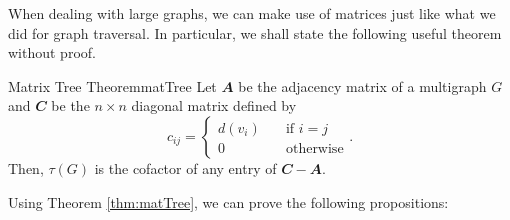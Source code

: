 \documentclass[math]{amznotes}
\theoremstyle{remark}
\newcommand{\0}{\mathbf{0}}
\newcommand{\1}{\mathbf{1}}
\begin{document}
When dealing with large graphs, we can make use of matrices just like what we did for graph traversal. In particular, we shall state the following useful theorem without proof.
\begin{thmbox}{Matrix Tree Theorem}{matTree}
    Let $\mathbfit{A}$ be the adjacency matrix of a multigraph $G$ and $\mathbfit{C}$ be the $n \times n$ diagonal matrix defined by
    \begin{equation*}
        c_{ij} = \begin{cases}
            d(v_i) & \quad\textrm{if } i = j \\
            0 & \quad\textrm{otherwise}
        \end{cases}.
    \end{equation*}
    Then, $\tau(G)$ is the cofactor of any entry of $\mathbfit{C - A}$. 
\end{thmbox}
Using Theorem \ref{thm:matTree}, we can prove the following propositions:
\end{document}
